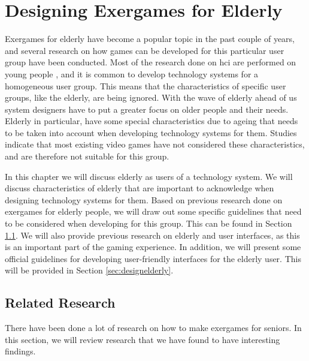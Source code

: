 \chapter{Designing Exergames for Elderly}
\label{chap:exforseniors}

Exergames for elderly have become a popular topic in the past couple of years, and several research on how games can be developed for this particular user group have been conducted. Most of the research done on \ac{hci} are performed on young people \cite{dickinson2007methods}, and it is common to develop technology systems for a homogeneous user group. This means that the characteristics of specific user groups, like the elderly, are being ignored. With the wave of elderly ahead of us system designers have to put a greater focus on older people and their needs. Elderly in particular, have some special characteristics due to ageing that needs to be taken into account when developing technology systems for them. Studies indicate that most existing video games have not considered these characteristics, and are therefore not suitable for this group. 

In this chapter we will discuss elderly as users of a technology system. We will discuss characteristics of elderly that are important to acknowledge when designing technology systems for them. Based on previous research done on exergames for elderly people, we will draw out some specific guidelines that need to be considered when developing for this group. This can be found in Section \ref{sec:relatedresearch}. We will also provide previous research on elderly and user interfaces, as this is an important part of the gaming experience.  In addition, we will present some official guidelines for developing user-friendly interfaces for the elderly user. This will be provided in Section \ref{sec:designelderly}. 

\section{Related Research}
\label{sec:relatedresearch}
There have been done a lot of research on how to make exergames for seniors. In this section, we will review research that we have found to have interesting findings.

